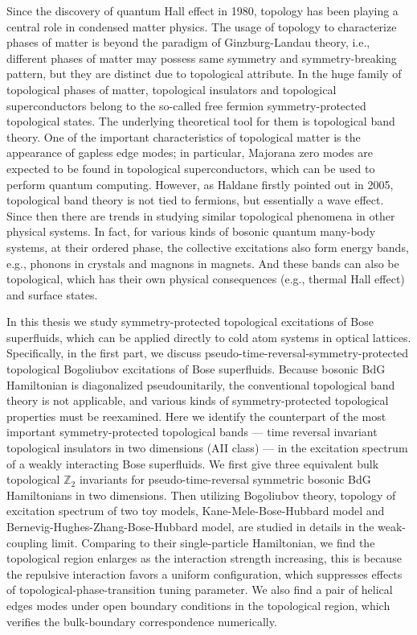 \begin{abstract*}  
Since the discovery of quantum Hall effect in 1980, topology has been playing a central role in condensed matter physics. The usage of topology to characterize phases of matter is beyond the paradigm of Ginzburg-Landau theory, i.e., different phases of matter may possess same symmetry and symmetry-breaking pattern, but they are distinct due to topological attribute. In the huge family of topological phases of matter, topological insulators and topological superconductors belong to the so-called free fermion symmetry-protected topological states. The underlying theoretical tool for them is topological band theory. One of the important characteristics of topological matter is the appearance of gapless edge modes; in particular, Majorana zero modes are expected to be found in topological superconductors, which can be used to perform quantum computing. However, as Haldane firstly pointed out in 2005, topological band theory is not tied to fermions, but essentially a wave effect. Since then there are trends in studying similar topological phenomena in other physical systems. In fact,
  for various kinds of bosonic quantum many-body systems, at their ordered phase, the collective excitations also form energy bands, e.g., phonons in crystals and magnons in magnets. And these bands can also be topological, which has their own physical consequences (e.g., thermal Hall effect) and surface states.

  In this thesis we study symmetry-protected topological excitations of Bose superfluids, which can be applied directly to cold atom systems in optical lattices. Specifically, in the first part, we discuss pseudo-time-reversal-symmetry-protected topological Bogoliubov excitations of Bose superfluids. Because bosonic BdG Hamiltonian is diagonalized pseudounitarily, the conventional topological band theory is not applicable,
  and various kinds of symmetry-protected topological properties must be reexamined. Here we identify the counterpart of the most important symmetry-protected topological bands --- time reversal invariant topological insulators in two dimensions (AII class) ---  in the excitation spectrum of a weakly interacting Bose superfluids.
  We first give three equivalent bulk topological $\mathbb Z_2$ invariants for pseudo-time-reversal symmetric bosonic BdG Hamiltonians in two dimensions. Then utilizing Bogoliubov theory, topology of excitation spectrum of two toy models, Kane-Mele-Bose-Hubbard model and Bernevig-Hughes-Zhang-Bose-Hubbard model, are studied in details in the weak-coupling limit. Comparing to their single-particle Hamiltonian, we find the topological region enlarges as the interaction strength increasing, this is because the repulsive interaction favors a uniform configuration, which suppresses effects of topological-phase-transition tuning parameter. We also find a pair of helical edges modes under open boundary conditions in the topological region, which verifies the bulk-boundary correspondence numerically.
  

\end{abstract*}
